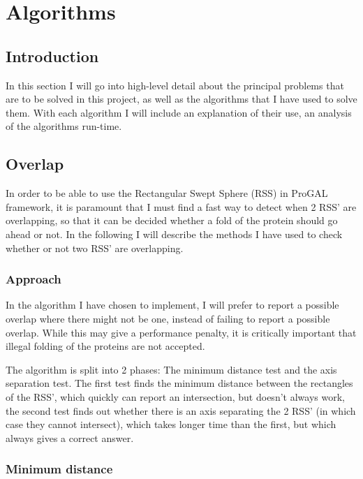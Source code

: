 
\section{Algorithms}
\label{algorithms}

\subsection{Introduction}
In this section I will go into high-level detail about the principal problems that are to be solved in this project, as well as the algorithms that I have used to solve them. With each algorithm I will include an explanation of their use, an analysis of the algorithms run-time. 

\subsection{Overlap}
\label{overlap}
In order to be able to use the Rectangular Swept Sphere (RSS) in ProGAL framework, it is paramount that I must find a fast way to detect when 2 RSS' are overlapping, so that it can be decided whether a fold of the protein should go ahead or not. In the following I will describe the methods I have used to check whether or not two RSS' are overlapping.

\subsubsection{Approach}
In the algorithm I have chosen to implement, I will prefer to report a possible overlap where there might not be one, instead of failing to report a possible overlap. While this may give a performance penalty, it is critically important that illegal folding of the proteins are not accepted. 

The algorithm is split into 2 phases: The minimum distance test and the axis separation test. The first test finds the minimum distance between the rectangles of the RSS', which quickly can report an intersection, but doesn't always work, the second test finds out whether there is an axis separating the 2 RSS' (in which case they cannot intersect), which takes longer time than the first, but which always gives a correct answer. 

\subsubsection{Minimum distance}

